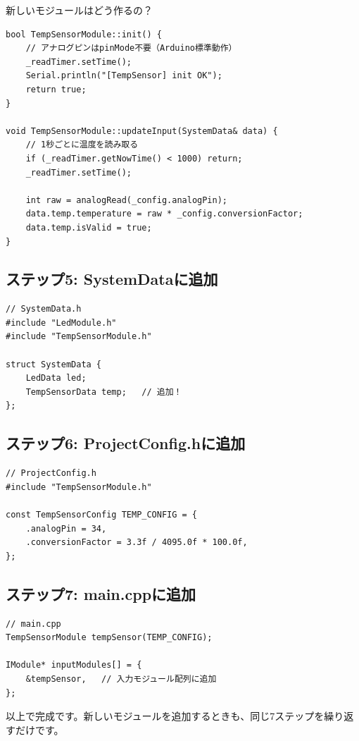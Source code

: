 \begin{qabox}{新しいモジュールはどう作るの？}
\begin{lstlisting}
bool TempSensorModule::init() {
    // アナログピンはpinMode不要（Arduino標準動作）
    _readTimer.setTime();
    Serial.println("[TempSensor] init OK");
    return true;
}

void TempSensorModule::updateInput(SystemData& data) {
    // 1秒ごとに温度を読み取る
    if (_readTimer.getNowTime() < 1000) return;
    _readTimer.setTime();

    int raw = analogRead(_config.analogPin);
    data.temp.temperature = raw * _config.conversionFactor;
    data.temp.isValid = true;
}
\end{lstlisting}

\subsection{ステップ5: SystemDataに追加}

\begin{lstlisting}
// SystemData.h
#include "LedModule.h"
#include "TempSensorModule.h"

struct SystemData {
    LedData led;
    TempSensorData temp;   // 追加！
};
\end{lstlisting}

\subsection{ステップ6: ProjectConfig.hに追加}

\begin{lstlisting}
// ProjectConfig.h
#include "TempSensorModule.h"

const TempSensorConfig TEMP_CONFIG = {
    .analogPin = 34,
    .conversionFactor = 3.3f / 4095.0f * 100.0f,
};
\end{lstlisting}

\subsection{ステップ7: main.cppに追加}

\begin{lstlisting}
// main.cpp
TempSensorModule tempSensor(TEMP_CONFIG);

IModule* inputModules[] = {
    &tempSensor,   // 入力モジュール配列に追加
};
\end{lstlisting}

以上で完成です。新しいモジュールを追加するときも、同じ7ステップを繰り返すだけです。

\end{qabox}

